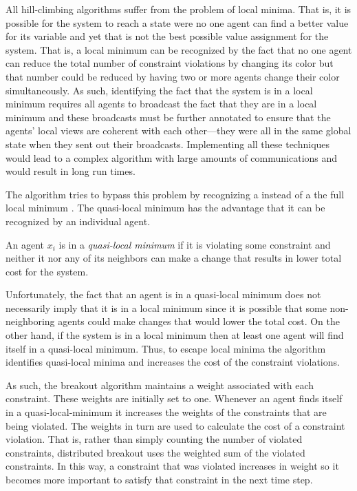All hill-climbing algorithms suffer from the problem of local minima.
That is, it is possible for the system to reach a state were no one
agent can find a better value for its variable and yet that is not the
best possible value assignment for the system.  That is, a local minimum can
be recognized by the fact that no one agent can reduce the total
number of constraint violations by changing its color but that number
could be reduced by having two or more agents change their color
simultaneously. As such, identifying the fact that the system is in a
local minimum requires all agents to broadcast the fact that they are
in a local minimum and these broadcasts must be further annotated to
ensure that the agents' local views are coherent with each
other---they were all in the same global state when they sent out
their broadcasts. Implementing all these techniques would lead to a
complex algorithm with large amounts of communications and would
result in long run times.

The  algorithm tries to bypass this problem
by recognizing a  instead of a the full local
minimum \cite{yokoo96a,hirayama05a,yokoo00a}. The quasi-local minimum
has the advantage that it can be recognized by an individual agent.

\begin{definition}
  An agent $x_i$ is in a \emph{quasi-local minimum} if it is violating
  some constraint and neither it nor any of its neighbors can make a
  change that results in lower total cost for the system.
\end{definition}

Unfortunately, the fact that an agent is in a quasi-local minimum does
not necessarily imply that it is in a local minimum since it is
possible that some non-neighboring agents could make changes that
would lower the total cost. On the other hand, if the system is in a
local minimum then at least one agent will find itself in a
quasi-local minimum. Thus, to escape local minima the algorithm
identifies quasi-local minima and increases the cost of the constraint
violations.

As such, the breakout algorithm maintains a weight associated
with each constraint. These weights are initially set to one. Whenever an
agent finds itself in a quasi-local-minimum it increases the weights
of the constraints that are being violated. The weights in turn are
used to calculate the cost of a constraint violation.  That is, rather
than simply counting the number of violated constraints, distributed
breakout uses the weighted sum of the violated constraints. In this
way, a constraint that was violated increases in weight so it becomes
more important to satisfy that constraint in the next time step.

